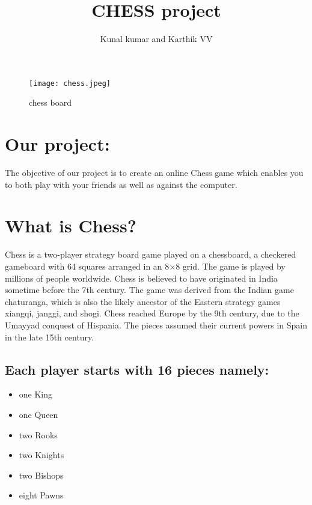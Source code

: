 \documentclass{article}
\title{CHESS project}
\author{Kunal kumar and  Karthik VV}
\begin{document}
\maketitle

\begin{figure}[ht]
\centering
\texttt{[image: chess.jpeg]}
\caption{{\Large chess board}}
\label{fig1}
\end{figure}



\section{Our project: }
The objective of our project is to create an online Chess game which enables you to both play with your friends as well as against the computer.\\



\section{What is Chess?}
Chess is a two-player strategy board game played on a chessboard, a checkered gameboard with 64 squares arranged in an 8×8 grid. The game is played by millions of people worldwide. Chess is believed to have originated in India sometime before the 7th century. The game was derived from the Indian game chaturanga, which is also the likely ancestor of the Eastern strategy games xiangqi, janggi, and shogi. Chess reached Europe by the 9th century, due to the Umayyad conquest of Hispania. The pieces assumed their current powers in Spain in the late 15th century.
\subsection{Each player starts with 16 pieces namely:}
\begin{itemize}
\item {one King}
\item {one Queen}
\item {two Rooks}
\item {two Knights}
\item {two Bishops}
\item {eight Pawns}
\end{itemize}
\end{document}
